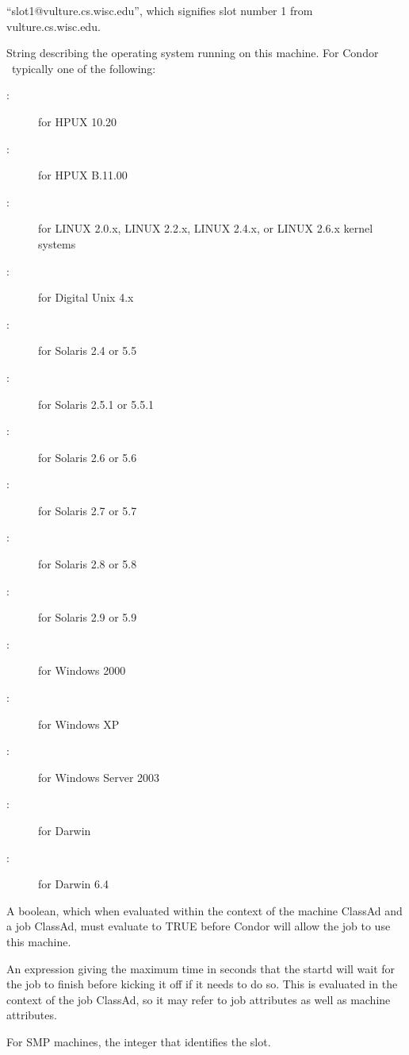 \begin{description}
``slot1@vulture.cs.wisc.edu'', which signifies slot number 1 from
vulture.cs.wisc.edu.
%
\item[\AdAttr{OpSys}:] String describing the operating system running on this
machine.  For Condor \VersionNotice\ typically one of the following:
	\begin{description}
	\item[:] for HPUX 10.20
	\item[:] for HPUX B.11.00
	\item[:] for LINUX 2.0.x, LINUX 2.2.x,
	LINUX 2.4.x, or LINUX 2.6.x kernel systems
	\item[:] for Digital Unix 4.x
	\item[:] for Solaris 2.4 or 5.5
	\item[:] for Solaris 2.5.1 or 5.5.1
	\item[:] for Solaris 2.6 or 5.6
	\item[:] for Solaris 2.7 or 5.7
	\item[:] for Solaris 2.8 or 5.8
	\item[:] for Solaris 2.9 or 5.9
	\item[:] for Windows 2000
	\item[:] for Windows XP
	\item[:] for Windows Server 2003
	\item[:] for Darwin
	\item[:] for Darwin 6.4
	\end{description}
%
\item[\AdAttr{Requirements}:] A boolean, which when evaluated within the context
of the machine ClassAd and a job ClassAd, must evaluate to
TRUE before Condor will allow the job to use this machine.
%
\item[\AdAttr{MaxJobRetirementTime}:] An expression giving the
maximum time in seconds that the startd will wait for the job to
finish before kicking it off if it needs to do so.  This is evaluated
in the context of the job ClassAd, so it may refer to job attributes
as well as machine attributes.
%
\item[\AdAttr{SlotID}:] For SMP machines, the integer
that identifies the slot.

\end{description}
